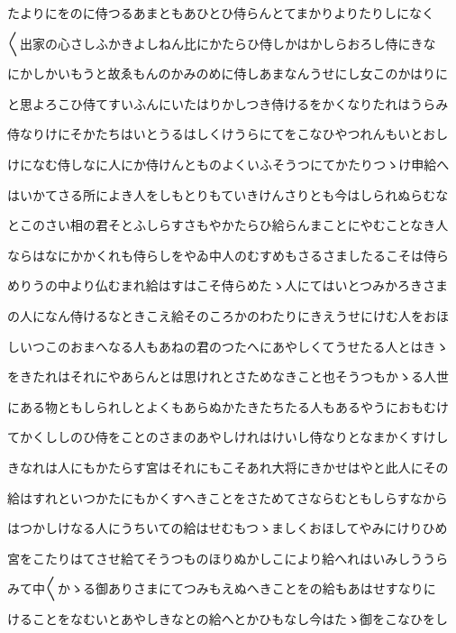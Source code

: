 \documentclass[a4paper,11pt,landscape]{ltjtarticle}
\begin{document}
\par\medskip
たよりにをのに侍つるあまともあひとひ侍らんとてまかりよりたりしになく
\par\medskip
〱出家の心さしふかきよしねん比にかたらひ侍しかはかしらおろし侍にきな
\par\medskip
にかしかいもうと故ゑもんのかみのめに侍しあまなんうせにし女このかはりに
\par\medskip
と思よろこひ侍てすいふんにいたはりかしつき侍けるをかくなりたれはうらみ
\par\medskip
侍なりけにそかたちはいとうるはしくけうらにてをこなひやつれんもいとおし
\par\medskip
けになむ侍しなに人にか侍けんとものよくいふそうつにてかたりつゝけ申給へ
\par\medskip
はいかてさる所によき人をしもとりもていきけんさりとも今はしられぬらむな
\par\medskip
とこのさい相の君そとふしらすさもやかたらひ給らんまことにやむことなき人
\par\medskip
ならはなにかかくれも侍らしをやゐ中人のむすめもさるさましたるこそは侍ら
\par\medskip
めりうの中より仏むまれ給はすはこそ侍らめたゝ人にてはいとつみかろきさま
\par\medskip
の人になん侍けるなときこえ給そのころかのわたりにきえうせにけむ人をおほ
\par\medskip
しいつこのおまへなる人もあねの君のつたへにあやしくてうせたる人とはきゝ
\par\medskip
をきたれはそれにやあらんとは思けれとさためなきこと也そうつもかゝる人世
\par\medskip
にある物ともしられしとよくもあらぬかたきたちたる人もあるやうにおもむけ
\par\medskip
てかくししのひ侍をことのさまのあやしけれはけいし侍なりとなまかくすけし
\par\medskip
きなれは人にもかたらす宮はそれにもこそあれ大将にきかせはやと此人にその
\par\medskip
給はすれといつかたにもかくすへきことをさためてさならむともしらすなから
\par\medskip
はつかしけなる人にうちいての給はせむもつゝましくおほしてやみにけりひめ
\par\medskip
宮をこたりはてさせ給てそうつものほりぬかしこにより給へれはいみしううら
\par\medskip
みて中〱かゝる御ありさまにてつみもえぬへきことをの給もあはせすなりに
\par\medskip
けることをなむいとあやしきなとの給へとかひもなし今はたゝ御をこなひをし
\par\medskip
\end{document}
